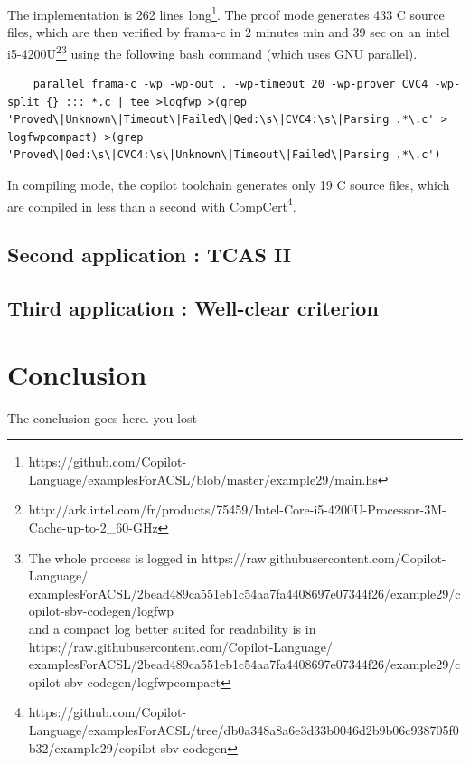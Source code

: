 \documentclass[a4paper,11pt,final]{article}
\begin{document}
	The implementation is 262 lines long\footnote{https://github.com/Copilot-Language/examplesForACSL/blob/master/example29/main.hs}. The proof mode generates 433 C source files, which are then verified by frama-c in 2 minutes min and 39 sec on an intel i5-4200U\footnote{http://ark.intel.com/fr/products/75459/Intel-Core-i5-4200U-Processor-3M-Cache-up-to-2\_60-GHz}\footnote{The whole process is logged in  https://raw.githubusercontent.com/Copilot-Language/\\examplesForACSL/2bead489ca551eb1c54aa7fa4408697e07344f26/example29/copilot-sbv-codegen/logfwp \\ and a compact log better suited for readability is in  https://raw.githubusercontent.com/Copilot-Language/\\examplesForACSL/2bead489ca551eb1c54aa7fa4408697e07344f26/example29/copilot-sbv-codegen/logfwpcompact} using the following bash command (which uses GNU parallel).
	\begin{lstlisting}
	parallel frama-c -wp -wp-out . -wp-timeout 20 -wp-prover CVC4 -wp-split {} ::: *.c | tee >logfwp >(grep 'Proved\|Unknown\|Timeout\|Failed\|Qed:\s\|CVC4:\s\|Parsing .*\.c' > logfwpcompact) >(grep 'Proved\|Qed:\s\|CVC4:\s\|Unknown\|Timeout\|Failed\|Parsing .*\.c')
	\end{lstlisting}
	
	In compiling mode, the copilot toolchain generates only 19 C source files, which are compiled in less than a second with CompCert\footnote{https://github.com/Copilot-Language/examplesForACSL/tree/db0a348a8a6e3d33b0046d2b9b06c938705f0b32/example29/copilot-sbv-codegen}.
	
	\subsection{Second application : TCAS II}
	\subsection{Third application : Well-clear criterion}
	
	\section*{Conclusion}
	The conclusion goes here.
	you lost 
	
	
	\cleardoublepage{}
	
	
	
	
\end{document}
